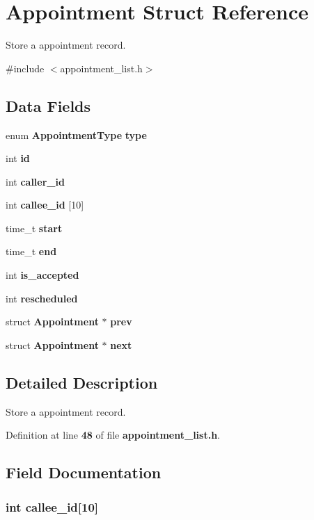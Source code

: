 \section{Appointment Struct Reference}
\label{struct_appointment}


Store a appointment record.  




{\ttfamily \#include $<$appointment\+\_\+list.\+h$>$}

\subsection*{Data Fields}
\begin{DoxyCompactItemize}
\item 
enum {\bf Appointment\+Type} {\bf type}
\item 
int {\bf id}
\item 
int {\bf caller\+\_\+id}
\item 
int {\bf callee\+\_\+id} [10]
\item 
time\+\_\+t {\bf start}
\item 
time\+\_\+t {\bf end}
\item 
int {\bf is\+\_\+accepted}
\item 
int {\bf rescheduled}
\item 
struct {\bf Appointment} $\ast$ {\bf prev}
\item 
struct {\bf Appointment} $\ast$ {\bf next}
\end{DoxyCompactItemize}


\subsection{Detailed Description}
Store a appointment record. 

Definition at line {\bf 48} of file {\bf appointment\+\_\+list.\+h}.



\subsection{Field Documentation}
\subsubsection[{callee\+\_\+id}]{\setlength{\rightskip}{0pt plus 5cm}int callee\+\_\+id[10]}\label{struct_appointment_a1c758224d618992d6bcda246e68384c3}


